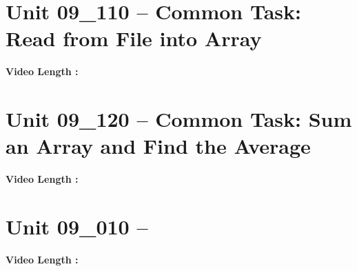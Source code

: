 \documentclass[letterpaper,12pt]{exam}
\newcommand{\unit}{Unit 09}
\begin{document}
\begin{questions}
\section*{\unit\_110 -- Common Task: Read from File into Array} 
\par{\selectfont\textbf{Video Length :}}
\section*{\unit\_120 -- Common Task: Sum an Array and Find the Average} 
\par{\selectfont\textbf{Video Length :}}
\section*{\unit\_010 -- } 
\par{\selectfont\textbf{Video Length :}}





\end{questions}
\end{document}
